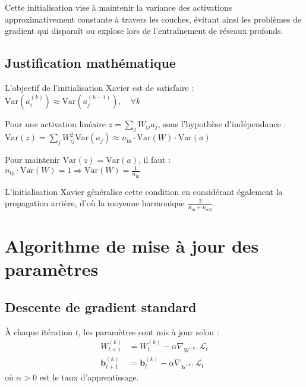 \documentclass[12pt,a4paper]{report}
\numberwithin{equation}{section}
\begin{document}
\begin{remark}
Cette initialisation vise à maintenir la variance des activations approximativement constante à travers les couches, évitant ainsi les problèmes de gradient qui disparaît ou explose lors de l'entraînement de réseaux profonds.
\end{remark}

\subsection{Justification mathématique}

L'objectif de l'initialisation Xavier est de satisfaire :
$\text{Var}(a^{(k)}_i) \approx \text{Var}(a^{(k-1)}_j), \quad \forall k$

Pour une activation linéaire $z = \sum_{j} W_{ij} a_j$, sous l'hypothèse d'indépendance :
$\text{Var}(z) = \sum_{j} W_{ij}^2 \text{Var}(a_j) \approx n_{\text{in}} \cdot \text{Var}(W) \cdot \text{Var}(a)$

Pour maintenir $\text{Var}(z) = \text{Var}(a)$, il faut :
$n_{\text{in}} \cdot \text{Var}(W) = 1 \Rightarrow \text{Var}(W) = \frac{1}{n_{\text{in}}}$

L'initialisation Xavier généralise cette condition en considérant également la propagation arrière, d'où la moyenne harmonique $\frac{2}{n_{\text{in}} + n_{\text{out}}}$.

\section{Algorithme de mise à jour des paramètres}

\subsection{Descente de gradient standard}

\begin{definition}
À chaque itération $t$, les paramètres sont mis à jour selon :
\begin{align}
W^{(k)}_{t+1} &= W^{(k)}_t - \alpha \nabla_{W^{(k)}} \mathcal{L}_t\\
\mathbf{b}^{(k)}_{t+1} &= \mathbf{b}^{(k)}_t - \alpha \nabla_{\mathbf{b}^{(k)}} \mathcal{L}_t
\end{align}
où $\alpha > 0$ est le taux d'apprentissage.
\end{definition}

\end{document}
